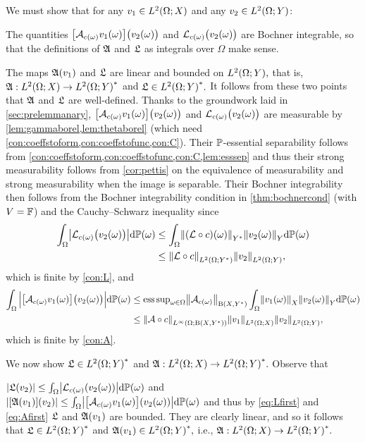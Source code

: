 \label{page:lemsvarwelldefinedproof}
We must show that for any $\vo \in \LtOX$ and any $\vt \in \LtOY$:
\bit
\item The quantities $\big[\Acomega \vo(\omega)\big]\big(\vt(\omega)\big)$ and $\Lcomega\big(\vt(\omega)\big)$ are Bochner integrable, so that the definitions of $\mathfrak{A}$ and $\mathfrak{L}$ as integrals over $\Omega$ make sense.
\item The maps $\mathfrak{A}(v_{1})$ and $\mathfrak{L}$ are linear and bounded on $\LtOY,$ that is, $\SA:\LtOX\rightarrow\LtOYas$ and $\SL \in \LtOYas.$
\eit
It follows from these two points that $\mathfrak{A}$ and $\mathfrak{L}$ are well-defined.
Thanks to the groundwork laid in \cref{sec:prelemmanary}, $\big[\Acomega \vo(\omega)\big]\big(\vt(\omega)\big)$ and $\Lcomega\big(\vt(\omega)\big)$  are measurable by \cref{lem:gammaborel,lem:thetaborel} (which need \cref{con:coeffstoform,con:coeffstofunc,con:C}).
Their $\mathbb P$-essential separability follows from \cref{con:coeffstoform,con:coeffstofunc,con:C,lem:esssep} and thus their strong measurability follows from \cref{cor:pettis} on the equivalence of measurability and strong measurability when the image is separable. Their Bochner integrability then follows from the Bochner integrability condition in \cref{thm:bochnercond} (with $V=\mathbb F$) and the Cauchy--Schwarz inequality since
\begin{align}
\int_\Omega \abs{\Lcomega\big(\vt(\omega)\big)}\dd\PP(\omega)&\leq \int_\Omega \NYs{\mleft(\rhs\circ\coeff\mright)(\omega)}\NY{\vt(\omega)}\dd\PP(\omega)\nonumber\\
&\leq \NLtOYs{\rhs\circ\coeff}\NLtOY{\vt},\label{eq:Lfirst}
\end{align}
which is finite by \cref{con:L}, and 
\begin{align}
\int_\Omega \Big|\big[\Acomega \vo(\omega)\big]\big(\vt(\omega)\big)\Big|\dd\PP(\omega) %
&\leq \esssup_{\omega \in \Omega} \Nhomspace{\Acomega} \int_\Omega \NX{\vo(\omega)}\NY{\vt(\omega)}\dd\PP(\omega)\nonumber\\
&\leq \NLiOhomspace{\toform\circ\coeff}\NLtOX{\vo}\NLtOY{\vt},\label{eq:Afirst}
\end{align}
which is finite by \cref{con:A}.

We now show $\SL\in  \LtOYas$ and $\SA:\LtOX \rightarrow \LtOYas.$ Observe that 

\noindent $\abs{\SL(\vt)} \leq \int_\Omega \abs{\Lcomega\mleft(\vt(\omega)\mright)}\dd\PP(\omega)$ and $\abs{\mleft[\SA \mleft(\vo\mright)\mright](\vt)} \leq \int_\Omega \abs{\mleft[\Acomega \vo(\omega)\mright]\mleft(\vt(\omega)\mright)}\dd\PP(\omega)$ and thus by \eqref{eq:Lfirst} and \eqref{eq:Afirst} $\mathfrak{L}$ and $\mathfrak{A}(v_{1})$ are bounded. They are clearly linear, and so it follows that $\SL \in \LtOYas$ and $\SA(\vo)\in \LtOYas,$ i.e., $\SA:\LtOX \rightarrow \LtOYas.$
\epf

